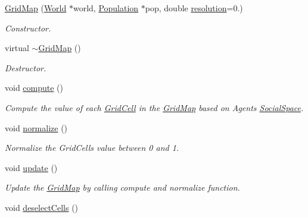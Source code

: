 \begin{DoxyCompactItemize}
\item 
\hyperlink{classGridMap_aa5a60e82b2bf8b2005ef7c71e7080904}{Grid\+Map} (\hyperlink{classWorld}{World} $\ast$world, \hyperlink{classPopulation}{Population} $\ast$pop, double \hyperlink{classGridMap_a8481536f663251381674b71090754e1d}{resolution}=0.)
\begin{DoxyCompactList}\small\item\em Constructor. \end{DoxyCompactList}\item 
virtual \hyperlink{classGridMap_a53cc0906130bae883f5d544480039118}{$\sim$\+Grid\+Map} ()
\begin{DoxyCompactList}\small\item\em Destructor. \end{DoxyCompactList}\item 
void \hyperlink{classGridMap_ac13f92dd7cdcfed701cf900eb592126b}{compute} ()\hypertarget{classGridMap_ac13f92dd7cdcfed701cf900eb592126b}{}\label{classGridMap_ac13f92dd7cdcfed701cf900eb592126b}

\begin{DoxyCompactList}\small\item\em Compute the value of each \hyperlink{classGridCell}{Grid\+Cell} in the \hyperlink{classGridMap}{Grid\+Map} based on Agents \hyperlink{classSocialSpace}{Social\+Space}. \end{DoxyCompactList}\item 
void \hyperlink{classGridMap_a5321e644c2398b2d0e50091b410f6ec3}{normalize} ()\hypertarget{classGridMap_a5321e644c2398b2d0e50091b410f6ec3}{}\label{classGridMap_a5321e644c2398b2d0e50091b410f6ec3}

\begin{DoxyCompactList}\small\item\em Normalize the Grid\+Cells value between 0 and 1. \end{DoxyCompactList}\item 
void \hyperlink{classGridMap_a5dcf97b44802b1ecf294f4e1fc79b94b}{update} ()\hypertarget{classGridMap_a5dcf97b44802b1ecf294f4e1fc79b94b}{}\label{classGridMap_a5dcf97b44802b1ecf294f4e1fc79b94b}

\begin{DoxyCompactList}\small\item\em Update the \hyperlink{classGridMap}{Grid\+Map} by calling compute and normalize function. \end{DoxyCompactList}\item 
void \hyperlink{classGridMap_a43a70209f5c8c5cf833500ce1d95880c}{deselect\+Cells} ()\hypertarget{classGridMap_a43a70209f5c8c5cf833500ce1d95880c}{}\label{classGridMap_a43a70209f5c8c5cf833500ce1d95880c}


\end{DoxyCompactItemize}

